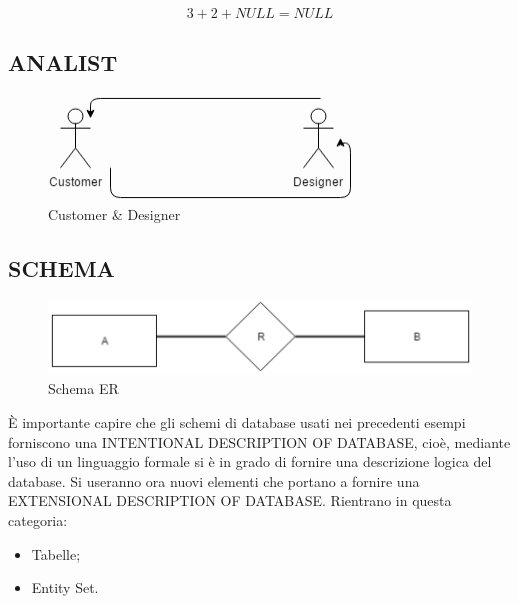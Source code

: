 \[
	3 + 2 + NULL = NULL
\]

\subsection{ANALIST}

\begin{center}
\begin{figure}[H]
\centering
\includegraphics[scale=1]{figures/custdes.png}
\caption{Customer \& Designer} 
\end{figure}
\end{center}

\subsection{SCHEMA}

\begin{center}
\begin{figure}[H]
\centering
\includegraphics[scale=1]{figures/ERschema.png}
\caption{Schema ER} 
\end{figure}
\end{center}

È importante capire che gli schemi di database usati nei precedenti esempi forniscono una INTENTIONAL DESCRIPTION OF DATABASE, cioè, mediante l’uso di un linguaggio formale si è in grado di fornire una descrizione logica del database. Si useranno ora nuovi elementi che portano a fornire una EXTENSIONAL DESCRIPTION OF DATABASE. Rientrano in questa categoria: 

\begin{itemize}

\item Tabelle;
\item Entity Set.

\end{itemize}

